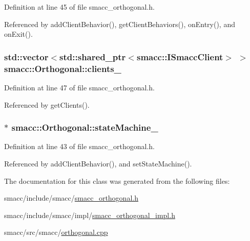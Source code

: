 Definition at line 45 of file smacc\+\_\+orthogonal.\+h.



Referenced by add\+Client\+Behavior(), get\+Client\+Behaviors(), on\+Entry(), and on\+Exit().

\subsubsection[{\texorpdfstring{clients\+\_\+}{clients_}}]{\setlength{\rightskip}{0pt plus 5cm}std\+::vector$<$std\+::shared\+\_\+ptr$<${\bf smacc\+::\+I\+Smacc\+Client}$>$ $>$ smacc\+::\+Orthogonal\+::clients\+\_\+\hspace{0.3cm}{\ttfamily [private]}}\hypertarget{classsmacc_1_1Orthogonal_a361fd1c4a5b0e6eadd55e919c19969cc}{}\label{classsmacc_1_1Orthogonal_a361fd1c4a5b0e6eadd55e919c19969cc}


Definition at line 47 of file smacc\+\_\+orthogonal.\+h.



Referenced by get\+Clients().

\subsubsection[{\texorpdfstring{state\+Machine\+\_\+}{stateMachine_}}]{$\ast$ smacc\+::\+Orthogonal\+::state\+Machine\+\_\+\hspace{0.3cm}{\ttfamily [private]}}\hypertarget{classsmacc_1_1Orthogonal_acea2058ac94667e46fc60ed3d4f524f7}{}\label{classsmacc_1_1Orthogonal_acea2058ac94667e46fc60ed3d4f524f7}


Definition at line 43 of file smacc\+\_\+orthogonal.\+h.



Referenced by add\+Client\+Behavior(), and set\+State\+Machine().



The documentation for this class was generated from the following files\+:\begin{DoxyCompactItemize}
\item 
smacc/include/smacc/\hyperlink{smacc__orthogonal_8h}{smacc\+\_\+orthogonal.\+h}\item 
smacc/include/smacc/impl/\hyperlink{smacc__orthogonal__impl_8h}{smacc\+\_\+orthogonal\+\_\+impl.\+h}\item 
smacc/src/smacc/\hyperlink{orthogonal_8cpp}{orthogonal.\+cpp}\end{DoxyCompactItemize}
